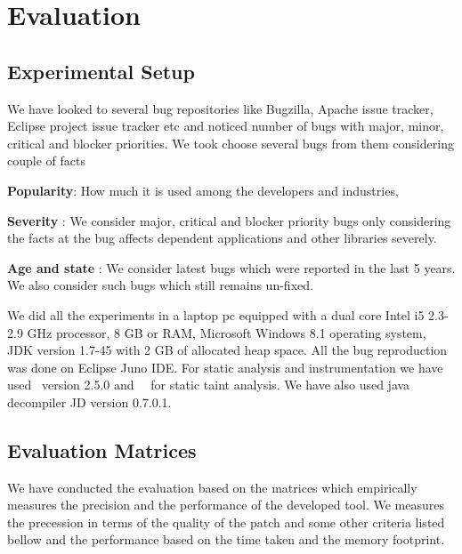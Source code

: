 
\section{Evaluation}
\label{sec:results}


\subsection{Experimental Setup}
\label{sub:experimentalSetup}

We have looked to several bug repositories like Bugzilla, Apache issue tracker,
Eclipse project issue tracker etc and noticed number of bugs with major, minor,
critical and blocker priorities. We took choose several bugs from them
considering couple of facts
\begin{mylist}

\item \textbf{Popularity}: How much it is used among the developers and
industries,
\item \textbf{Severity} : We consider major, critical and blocker priority bugs
only considering the facts at the bug affects dependent applications and other
libraries severely.
\item \textbf{Age and state} : We consider latest bugs which were reported in
the last 5 years.
We also consider such bugs which still remains un-fixed.

We did all the experiments in a laptop pc equipped with a dual core Intel i5
2.3-2.9 GHz processor, 8 GB or RAM, Microsoft Windows 8.1 operating system, JDK
version 1.7-45 with 2 GB of allocated heap space. All the bug reproduction was
done on
Eclipse Juno IDE. For static analysis and instrumentation we have used \soot\
version 2.5.0 and \soot\ \infoflow\ for static taint analysis. We have also used
java decompiler JD version 0.7.0.1. 

\end{mylist}

\subsection{Evaluation Matrices}
\label{sub:evaluationMartices}

We have conducted the evaluation based on the matrices which empirically
measures the precision and the performance of the developed tool. We measures
the precession in terms of the quality of the patch and some other criteria
listed bellow and the performance based on the time taken and the memory
footprint.

